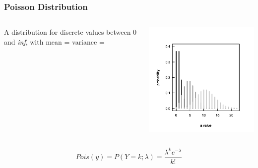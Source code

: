 \documentclass{beamer}
\begin{document}
\begin{frame}[fragile]
    \frametitle{Poisson Distribution}
    \large
    \begin{columns}
        \begin{column}{0.5\textwidth}
            A distribution for discrete values between 0 and \textit{inf}, with mean = variance = \lambda
        \end{column}
        \begin{column}{0.5\textwidth}
            \includegraphics[width=\textwidth]{lectures/day_9_refreshing_glm/figures/unnamed-chunk-9-1.png}
        \end{column}
    \end{columns}

    \[
    Pois(y) = P(Y = k; \lambda) = \frac{\lambda^k e^{-\lambda}}{k!}
    \]
\end{frame}
\end{document}
